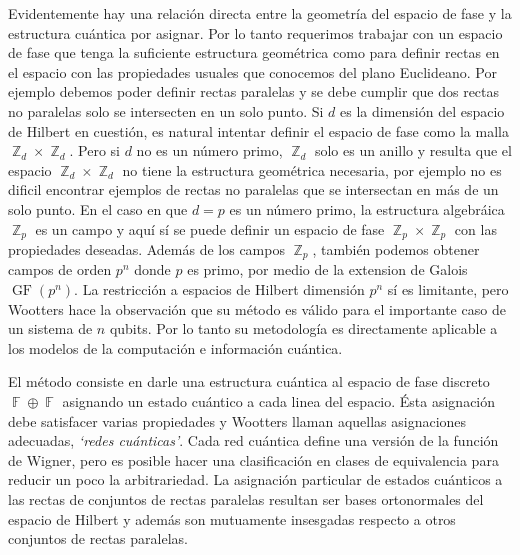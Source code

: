 \documentclass[a4paper]{report}
\DeclareMathOperator{\Z}{\mathbb{Z}}
\DeclareMathOperator{\F}{\mathbb{F}}
\DeclareMathOperator{\GF}{GF}
\begin{document}
  Evidentemente hay una relación directa entre la geometría
  del espacio de fase y la estructura cuántica por asignar.
  Por lo tanto requerimos trabajar con un espacio de fase
  que tenga la suficiente estructura geométrica como para
  definir rectas en el espacio con las propiedades usuales
  que conocemos del plano Euclideano.  Por ejemplo debemos
  poder definir rectas paralelas y se debe cumplir que dos
  rectas no paralelas solo se intersecten en un solo punto.
  Si $d$ es la dimensión del espacio de Hilbert en cuestión,
  es natural intentar definir el espacio de fase como la
  malla $\Z_d \times \Z_d$. Pero si $d$ no es un número
  primo, $\Z_d$ solo es un anillo y resulta que el espacio
  $\Z_d \times \Z_d$ no tiene la estructura geométrica
  necesaria, por ejemplo no es dificil encontrar ejemplos de
  rectas no paralelas que se intersectan en más de un solo
  punto. En el caso en que $d = p$ es un número primo, la
  estructura algebráica $\Z_p$ es un campo y aquí sí se
  puede definir un espacio de fase $\Z_p \times \Z_p$ con
  las propiedades deseadas.  Además de los campos $\Z_p$,
  también podemos obtener campos de orden $p^{n}$ donde $p$
  es primo, por medio de la extension de Galois
  $\GF\left(p^{n}\right)$.  La restricción a espacios de
  Hilbert dimensión $p^{n}$ sí es limitante, pero Wootters
  hace la observación que su método es válido para el
  importante caso de un sistema de $n$ qubits. Por lo tanto
  su metodología es directamente aplicable a los modelos de
  la computación e información cuántica.

  El método consiste en darle una estructura cuántica al
  espacio de fase discreto $\F \oplus \F$
  asignando un estado cuántico a cada linea del espacio.
  Ésta asignación debe satisfacer varias propiedades y
  Wootters llaman aquellas asignaciones adecuadas,
  \textit{`redes cuánticas'}. Cada red cuántica define una
  versión de la función de Wigner, pero es posible hacer una
  clasificación en clases de equivalencia para reducir un
  poco la arbitrariedad. La asignación particular de estados
  cuánticos a las rectas de conjuntos de rectas paralelas
  resultan ser bases ortonormales del espacio de Hilbert y
  además son mutuamente insesgadas respecto a otros
  conjuntos de rectas paralelas.
\end{document}
